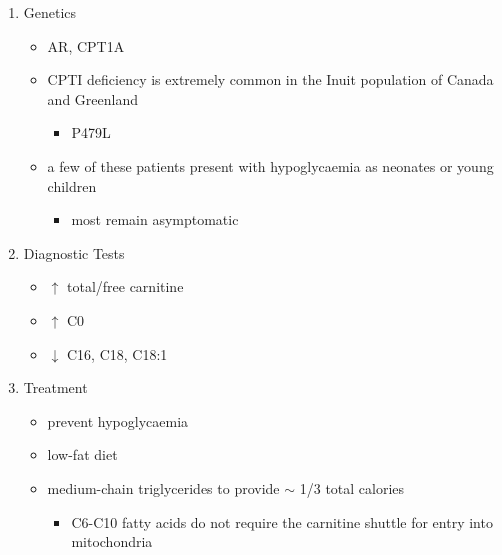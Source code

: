 \documentclass[12pt]{scrartcl}
\begin{document}
\begin{enumerate}
\item Genetics
\label{sec:orgb8123a3}
\begin{itemize}
\item AR, CPT1A
\item CPTI deficiency is extremely common in the Inuit population of Canada and Greenland
\begin{itemize}
\item P479L
\end{itemize}
\item a few of these patients present with hypoglycaemia as neonates or young children
\begin{itemize}
\item most remain asymptomatic
\end{itemize}
\end{itemize}
\item Diagnostic Tests
\label{sec:org5d99cff}
\begin{itemize}
\item \(\uparrow\) total/free carnitine
\item \(\uparrow\) C0
\item \(\downarrow\) C16, C18, C18:1
\end{itemize}
\item Treatment
\label{sec:org7ff213b}
\begin{itemize}
\item prevent hypoglycaemia
\item low-fat diet
\item medium-chain triglycerides to provide \(\sim\) 1/3 total calories
\begin{itemize}
\item C6-C10 fatty acids do not require the carnitine shuttle for entry
into mitochondria
\end{itemize}
\end{itemize}
\end{enumerate}
\end{document}
